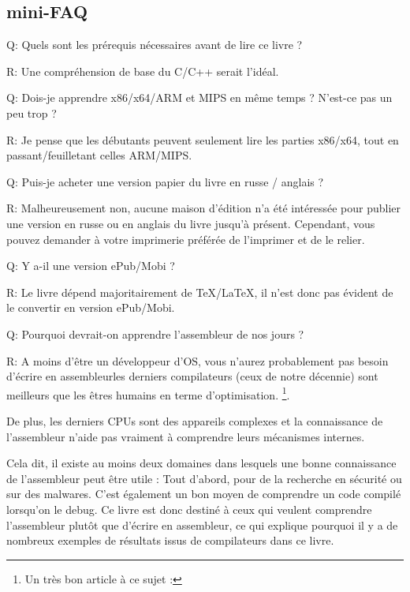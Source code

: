 \subsection*{mini-FAQ}

\par Q: Quels sont les prérequis nécessaires avant de lire ce livre ?
\par R: Une compréhension de base du C/C++ serait l'idéal.

\par Q: Dois-je apprendre x86/x64/ARM et MIPS en même temps ? N'est-ce pas un peu trop ?
\par R: Je pense que les débutants peuvent seulement lire les parties x86/x64, tout en passant/feuilletant celles ARM/MIPS.

\par Q: Puis-je acheter une version papier du livre en russe / anglais ?
\par R: Malheureusement non, aucune maison d'édition n'a été intéressée pour publier une version en russe ou en anglais du livre jusqu'à présent.
Cependant, vous pouvez demander à votre imprimerie préférée de l'imprimer et de le relier.

\par Q: Y a-il une version ePub/Mobi ?
\par R: Le livre dépend majoritairement de TeX/LaTeX, il n'est donc pas évident de le convertir en version ePub/Mobi.

\par Q: Pourquoi devrait-on apprendre l'assembleur de nos jours ?
\par R: A moins d'être un développeur d'\ac{OS}, vous n'aurez probablement pas besoin d'écrire en assembleur\textemdash{}les derniers compilateurs (ceux de notre décennie) sont meilleurs que les êtres humains en terme d'optimisation. \footnote{Un très bon article à ce sujet : \InSqBrackets{\AgnerFog}}.

De plus, les derniers \ac{CPU}s sont des appareils complexes et la connaissance de l'assembleur n'aide pas vraiment à comprendre leurs mécanismes internes.

Cela dit, il existe au moins deux domaines dans lesquels une bonne connaissance de l'assembleur peut être utile : 
Tout d'abord, pour de la recherche en sécurité ou sur des malwares. C'est également un bon moyen de comprendre un code compilé lorsqu'on le debug.
Ce livre est donc destiné à ceux qui veulent comprendre l'assembleur plutôt que d'écrire en assembleur, ce qui explique pourquoi il y a de nombreux exemples de résultats issus de compilateurs dans ce livre. 

